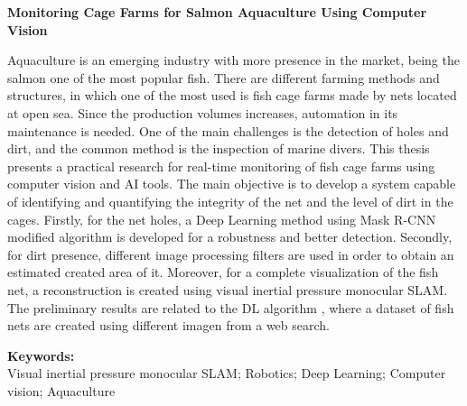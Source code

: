 
\begin{center}
\large \vspace{-1.5cm} \textbf{Monitoring Cage Farms for Salmon Aquaculture Using Computer Vision}
\end{center}
Aquaculture is an emerging industry with more presence in the market, being the salmon one of the most popular fish. There are different farming methods and structures, in which one of the most used is fish cage farms made by nets located at open sea. Since the production volumes increases, automation in its maintenance is needed. One of the main challenges is the detection of holes and dirt, and the common method is the inspection of marine divers. This thesis presents a practical research for real-time monitoring of fish cage farms using computer vision and AI tools. The main objective is to develop a system capable of identifying and quantifying the integrity of the net and the level of dirt in the cages. Firstly, for the net holes, a Deep Learning method using Mask R-CNN modified algorithm is developed for a robustness and better detection. Secondly, for dirt presence, different image processing filters are used in order to obtain an estimated created area of it. Moreover, for a complete visualization of the fish net, a reconstruction is created using visual inertial pressure monocular SLAM. The preliminary results are related to the DL algorithm , where a dataset of fish nets are created using different imagen from a web search.

\noindent \textbf{Keywords:}\\
\noindent Visual inertial pressure monocular SLAM; Robotics; Deep Learning; Computer vision; Aquaculture



